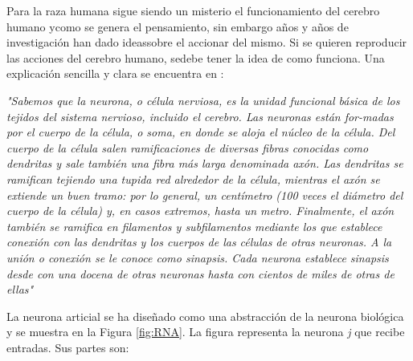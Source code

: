 \documentclass[12pt]{article}
\begin{document}
Para la raza humana sigue siendo un misterio el funcionamiento del cerebro humano ycomo se genera el pensamiento, sin embargo años y años de investigación han dado ideassobre el accionar del mismo. Si se quieren reproducir las acciones del cerebro humano, sedebe tener la idea de como funciona. Una explicación sencilla y clara se encuentra en \cite{IA}:

\begin{center}
\textit{"Sabemos que la neurona, o célula nerviosa, es la unidad funcional básica de los tejidos del sistema nervioso, incluido el cerebro. Las neuronas están for-madas por el cuerpo de la célula, o soma, en donde se aloja el núcleo de la célula. Del cuerpo de la célula salen ramificaciones de diversas fibras conocidas como dendritas y sale también una fibra más larga denominada axón. Las dendritas se ramifican tejiendo una tupida red alrededor de la célula, mientras el axón se extiende un buen tramo: por lo general, un centímetro (100 veces el diámetro del cuerpo de la célula) y, en casos extremos, hasta un metro. Finalmente, el axón también se ramifica en filamentos y subfilamentos mediante los que establece conexión con las dendritas y los cuerpos de las células de otras neuronas. A la unión o conexión se le conoce como sinapsis. Cada neurona establece sinapsis desde con una docena de otras neuronas hasta con cientos de miles de otras de ellas"}
\end{center}

La neurona articial se ha diseñado como una abstracción de la neurona biológica y se muestra en la Figura \ref{fig:RNA}. La figura representa  la neurona \textit{j} que recibe entradas. Sus partes son:

\clearpage
\end{document}

